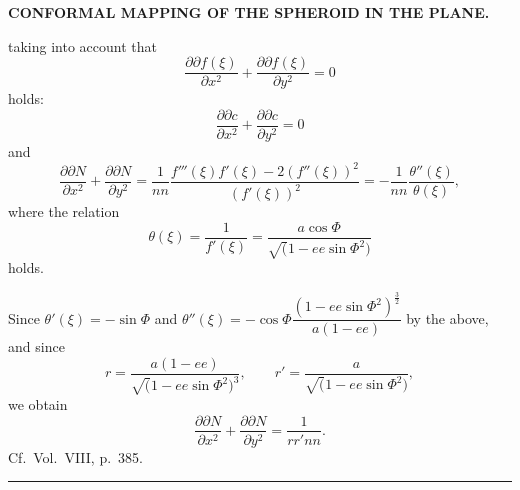 \par\clearpage
\noindent\null\hfill{\small\textbf{CONFORMAL MAPPING OF THE SPHEROID IN THE PLANE.}}\hfill{}\par\medskip

{\small
\noindent taking into account that
\[
\frac{\partial\partial f(\xi)}{\partial x^2}
+\frac{\partial\partial f(\xi)}{\partial y^2}=0
\]
\noindent holds:
\begin{equation*}
\frac{\partial\partial c}{\partial x^2}
+\frac{\partial\partial c}{\partial y^2}=0
\tag*{6)}
\end{equation*}
\noindent and
\begin{equation*}
\frac{\partial\partial N}{\partial x^2}
+\frac{\partial\partial N}{\partial y^2}
=\frac1{nn}\frac{f'''(\xi)f'(\xi)-2(f''(\xi))^2}{(f'(\xi))^2}
=-\frac1{nn}\frac{\theta''(\xi)}{\theta(\xi)},
\tag*{7)}
\end{equation*}
\noindent where the relation
\[
\theta(\xi)=\frac1{f'(\xi)}=\frac{a\cos\Phi}{\surd(1-ee\sin\Phi^2)}
\]
\noindent holds.

Since \(\theta'(\xi)=-\sin\Phi\) and
\(\theta''(\xi)=-\cos\Phi\dfrac{(1-ee\sin\Phi^2)^{\frac32}}{a(1-ee)}\) by the above, and since
\[
r=\frac{a(1-ee)}{\surd(1-ee\sin\Phi^2)^3},\qquad
r'=\frac{a}{\surd(1-ee\sin\Phi^2)},
\]
\noindent we obtain
\begin{equation*}
\frac{\partial\partial N}{\partial x^2}
+\frac{\partial\partial N}{\partial y^2}=\frac1{rr'nn}.
\tag*{8)}
\end{equation*}
\noindent Cf.\ Vol.\ VIII, p.\ 385.
\begin{center}\rule{.24\linewidth}{.4pt}\end{center}

}
